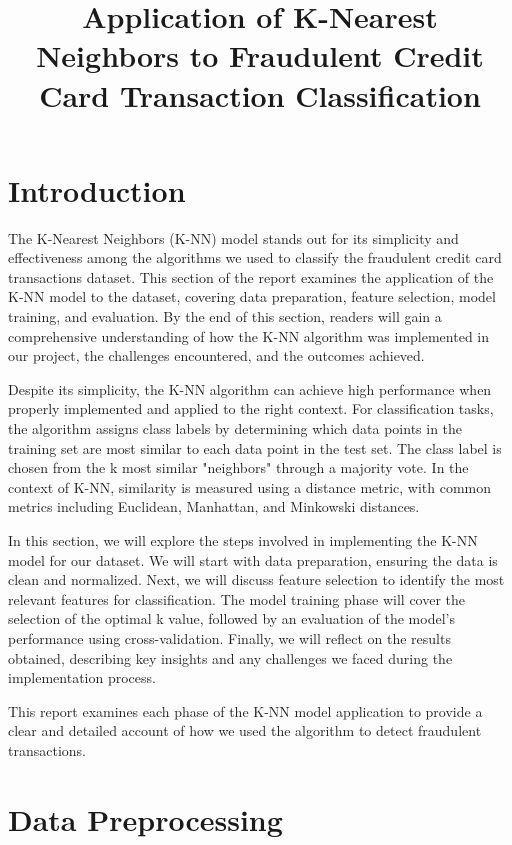 \documentclass{article}
\title{Application of K-Nearest Neighbors to Fraudulent Credit Card Transaction Classification}
\author{}
\date{}
\begin{document}
\maketitle

\section{Introduction}

The K-Nearest Neighbors (K-NN) model stands out for its simplicity and effectiveness among the algorithms we used to classify the fraudulent credit card transactions dataset. This section of the report examines the application of the K-NN model to the dataset, covering data preparation, feature selection, model training, and evaluation. By the end of this section, readers will gain a comprehensive understanding of how the K-NN algorithm was implemented in our project, the challenges encountered, and the outcomes achieved.

Despite its simplicity, the K-NN algorithm can achieve high performance when properly implemented and applied to the right context. For classification tasks, the algorithm assigns class labels by determining which data points in the training set are most similar to each data point in the test set. The class label is chosen from the k most similar "neighbors" through a majority vote. In the context of K-NN, similarity is measured using a distance metric, with common metrics including Euclidean, Manhattan, and Minkowski distances.

In this section, we will explore the steps involved in implementing the K-NN model for our dataset. We will start with data preparation, ensuring the data is clean and normalized. Next, we will discuss feature selection to identify the most relevant features for classification. The model training phase will cover the selection of the optimal k value, followed by an evaluation of the model's performance using cross-validation. Finally, we will reflect on the results obtained, describing key insights and any challenges we faced during the implementation process.

This report examines each phase of the K-NN model application to provide a clear and detailed account of how we used the algorithm to detect fraudulent transactions.

\section{Data Preprocessing}
\end{document}
